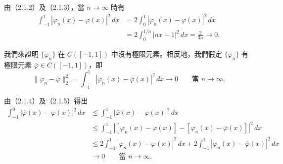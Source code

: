 \documentclass[11pt,a4paper,twoside]{article}
\newif\ifstudynotes
\newcommand{\StudyNote}[2]{%
    \ifstudynotes
    \begin{studyNote}[title={#1}]
    #2
    \end{studyNote}
    \fi
}
\newcommand{\pnum}[1]{%
    \makebox[0pt][r]{%
        \scriptsize\textbf{[#1]}\hspace{0.7em}%
    }%
}
\begin{document}
由（2.1.2）及（2.1.3），當 $n\to\infty$ 時有
\begin{equation}
    \begin{aligned}
        \int_{-1}^{1}
        |\varphi_n(x)-\varphi(x)|^2\,dx
         & =
        2\int_{0}^{1}
        |\varphi_n(x)-\varphi(x)|^2\,dx
        \\
         & =
        2\int_{0}^{1/n}
        |nx-1|^2\,dx
        =
        \frac{2}{3n}
        \longrightarrow0.
    \end{aligned}
    \tag{2.1.4}
\end{equation}
\StudyNote{註解1：為什麼這串估計最後可以推出積分等於零？}{
    先注意
    \[
        \overline{\varphi}-\varphi
        =
        (\varphi_n-\varphi)-(\varphi_n-\overline{\varphi}).
    \]
    所以原式中把 $\overline{\varphi}-\varphi$ 改寫成兩個差的組合，
    本質上只是代數恆等式。

    接著使用
    \[
        |a-b|^2\le 2|a|^2+2|b|^2,
    \]
    令 $a=\varphi_n-\varphi$、$b=\varphi_n-\overline{\varphi}$，得到
    \[
        |\overline{\varphi}-\varphi|^2
        \le
        2|\varphi_n-\varphi|^2
        +
        2|\varphi_n-\overline{\varphi}|^2.
    \]

    積分後，第一項由（2.1.4）趨近 $0$，第二項由（2.1.5）趨近 $0$。
    因此
    \[
        0\le
        \int_{-1}^{0}
        |\overline{\varphi}-\varphi|^2\,dx
        \le
        \text{一個趨近 }0\text{ 的量}.
    \]

    左側積分本身不含 $n$，是一個固定的非負數；
    既然它可以被任意小的正數壓住，只能有
    \[
        \boxed{
            \int_{-1}^{0}
            |\overline{\varphi}(x)-\varphi(x)|^2\,dx=0
        }.
    \]
}
\newpage

\noindent
\pnum{38}
我們來證明 $\{\varphi_n\}$ 在 $C([-1,1])$ 中沒有極限元素。相反地，我們假定
$\{\varphi_n\}$ 有極限元素 $\overline{\varphi}\in C([-1,1])$，即
\begin{equation}
    \|\varphi_n-\overline{\varphi}\|_2^2
    =
    \int_{-1}^{1}
    |\varphi_n(x)-\overline{\varphi}(x)|^2\,dx
    \longrightarrow 0
    \qquad
    \text{當 }n\to\infty.
    \tag{2.1.5}
\end{equation}

\noindent
\pnum{39}
由（2.1.4）及（2.1.5）得出
\[
    \begin{aligned}
        \int_{-1}^{0}
        |\overline{\varphi}(x)-\varphi(x)|^2\,dx
         & \leq
        \int_{-1}^{1}
        |\overline{\varphi}(x)-\varphi(x)|^2\,dx
        \\
         & \leq
        \int_{-1}^{1}
        \left|
        [\varphi_n(x)-\varphi(x)]
        -
        [\varphi_n(x)-\overline{\varphi}(x)]
        \right|^2\,dx
        \\
         & \leq
        2\int_{-1}^{1}
        |\varphi_n(x)-\varphi(x)|^2\,dx
        +
        2\int_{-1}^{1}
        |\varphi_n(x)-\overline{\varphi}(x)|^2\,dx
        \\
         & \longrightarrow 0
        \qquad
        \text{當 }n\to\infty.
    \end{aligned}
\]
\end{document}
